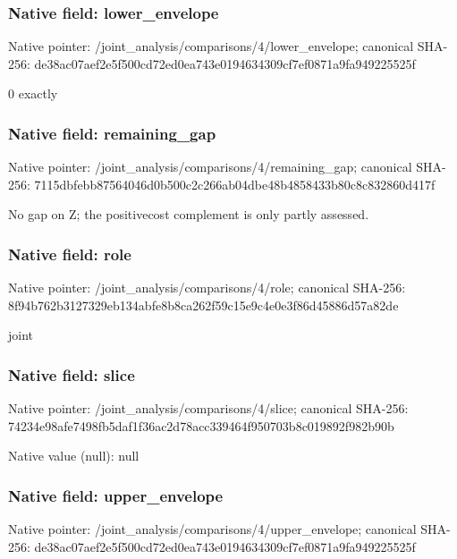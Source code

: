 \documentclass[10pt,a4paper]{article}
\begin{document}
\subsubsection{Native field: lower\_envelope}


Native pointer: /joint\_analysis/comparis\allowbreak{}ons/4/lower\_envelope; canonical SHA-256: de38ac07aef2e5f500cd72ed\allowbreak{}0ea743e0194634309cf7ef08\allowbreak{}71a9fa949225525f


0 exactly


\subsubsection{Native field: remaining\_gap}


Native pointer: /joint\_analysis/comparis\allowbreak{}ons/4/remaining\_gap; canonical SHA-256: 7115dbfebb87564046d0b500\allowbreak{}c2c266ab04dbe48b4858433b\allowbreak{}80c8c832860d417f


No gap on Z; the positivecost complement is only partly assessed.


\subsubsection{Native field: role}


Native pointer: /joint\_analysis/comparisons/4/role; canonical SHA-256: 8f94b762b3127329eb134abf\allowbreak{}e8b8ca262f59c15e9c4e0e3f\allowbreak{}86d45886d57a82de


joint


\subsubsection{Native field: slice}


Native pointer: /joint\_analysis/comparisons/4/slice; canonical SHA-256: 74234e98afe7498fb5daf1f3\allowbreak{}6ac2d78acc339464f950703b\allowbreak{}8c019892f982b90b



Native value (null): null



\subsubsection{Native field: upper\_envelope}


Native pointer: /joint\_analysis/comparis\allowbreak{}ons/4/upper\_envelope; canonical SHA-256: de38ac07aef2e5f500cd72ed\allowbreak{}0ea743e0194634309cf7ef08\allowbreak{}71a9fa949225525f
\end{document}
